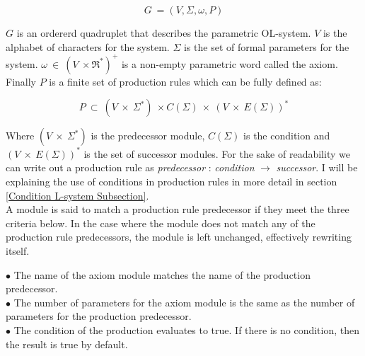 \begin{flushleft}
\vspace{5mm}

\begin{equation}
G~ = (V, \Sigma, \omega, P)
\end{equation}
\vspace{5mm}

$G$ is an ordererd quadruplet that describes the parametric OL-system. $V$ is the alphabet of characters for the system. $\Sigma$ is the set of formal parameters for the system. $\omega~ \in~ (V~ \times \Re^*)^+$ is a non-empty parametric word called the axiom. Finally $P$ is a finite set of production rules which can be fully defined as:

\vspace{5mm}

\begin{equation}
P~ \subset~ (V~ \times~ \Sigma^*)~ \times C(\Sigma)~ \times~ (V~ \times~ E(\Sigma))^*
\end{equation}

\vspace{5mm} 

Where $(V~ \times~ \Sigma^*) $ is the predecessor module, $C(\Sigma) $ is the condition and $(V~ \times~ E(\Sigma))^* $ is the set of successor modules. For the sake of readability we can write out a production rule as \textit{predecessor} : \textit{condition} $\rightarrow$ \textit{successor}. I will be explaining the use of conditions in production rules in more detail in section \ref{Condition L-system Subsection}.\\
A module is said to match a production rule predecessor if they meet the three criteria below. In the case where the module does not match any of the production rule predecessors, the module is left unchanged, effectively rewriting itself. \\

\vspace{5mm}

$\bullet$ The name of the axiom module matches the name of the production predecessor. \\
$\bullet$ The number of parameters for the axiom module is the same as the number of parameters for the production predecessor. \\
$\bullet$ The condition of the production evaluates to true. If there is no condition, then the result is true by default.\\

\vspace{5mm}

\end{flushleft}

